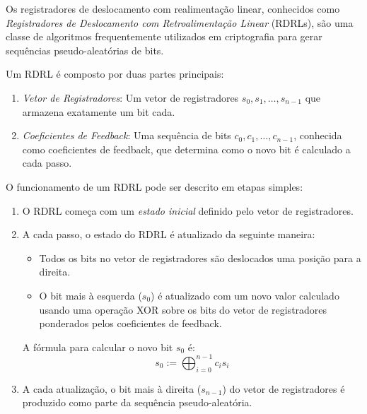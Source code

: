 Os registradores de deslocamento com realimentação linear, conhecidos como {\em Registradores de Deslocamento com Retroalimentação Linear} (RDRLs), são uma classe de algoritmos frequentemente utilizados em criptografia para gerar sequências pseudo-aleatórias de bits.

Um RDRL é composto por duas partes principais:
\begin{enumerate}
    \item[] {\em Vetor de Registradores}: Um vetor de registradores \(s_0, s_1, \dots, s_{n-1}\) que armazena exatamente um bit cada.
    \item[] {\em Coeficientes de Feedback}: Uma sequência de bits \(c_0, c_1, \dots, c_{n-1}\), conhecida como coeficientes de feedback, que determina como o novo bit é calculado a cada passo.
\end{enumerate}

O funcionamento de um RDRL pode ser descrito em etapas simples:

\begin{enumerate}
    \item O RDRL começa com um {\em estado inicial} definido pelo vetor de registradores.
    \item A cada passo, o estado do RDRL é atualizado da seguinte maneira:
    \begin{itemize}
        \item Todos os bits no vetor de registradores são deslocados uma posição para a direita.
        \item O bit mais à esquerda ($s_0$) é atualizado com um novo valor calculado usando uma operação XOR sobre os bits do vetor de registradores ponderados pelos coeficientes de feedback.
    \end{itemize}
    A fórmula para calcular o novo bit $s_0$ é:
    \begin{displaymath}
    s_0 := \bigoplus_{i=0}^{n-1} c_i s_i
    \end{displaymath}

    \item A cada atualização, o bit mais à direita ($s_{n-1}$) do vetor de registradores é produzido como parte da sequência pseudo-aleatória.
\end{enumerate}

